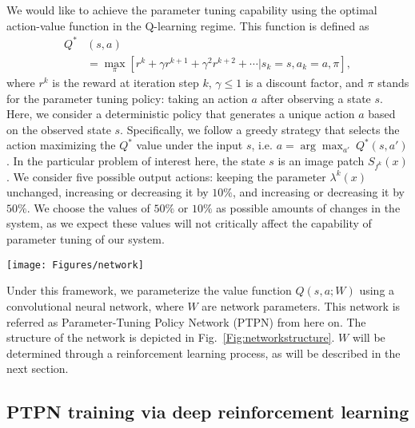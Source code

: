 \documentclass[journal]{IEEEtran}
\begin{document}
We would like to achieve the parameter tuning capability using the optimal action-value function in the Q-learning regime\cite{Watkins:ML:1992}. This function is defined as 
\begin{equation}
\begin{split}
	Q^*&(s, a)\\
	&=\max_{\pi}[r^k+\gamma r^{k+1}+\gamma^2 r^{k+2}+\cdots|s_k =s,a_k=a,\pi ],
\end{split}
\end{equation}
where $r^k$ is the reward at iteration step $k$, $\gamma\le 1$ is a discount factor, and $\pi$ stands for the parameter tuning policy: taking an action $a$ after observing a state $s$. Here, we consider a deterministic policy that generates a unique action $a$ based on the observed state $s$. Specifically, we follow a greedy strategy that selects the action maximizing the $Q^*$ value under the input $s$, i.e. $a= \arg\max_{a'}~Q^*(s,a')$. In the particular problem of interest here, the state $s$ is an image patch $S_{f^k}(x)$. We consider five possible output actions: keeping the parameter $\lambda^k(x)$ unchanged, increasing or decreasing it by $10\%$, and increasing or decreasing it by $50\%$. We choose the values of $50\%$ or $10\%$ as possible amounts of changes in the system, as we expect these values will not critically affect the capability of parameter tuning of our system. 

\begin{figure*}[htbp]
  \texttt{[image: Figures/network]}
  \caption{Network structure of PTPN. The input is a patch cropped out of the solution image $f^k$. The five outputs are directions and magnitudes of changing the parameter at the patch center pixel. Number of units and data sizes at each layer are specified at the top. Connection between subsequent layers are also presented.}
  \label{Fig:networkstructure}
\end{figure*}

Under this framework, we parameterize the value function $Q(s,a;W)$ using a convolutional neural network, where $W$ are network parameters. This network is referred as Parameter-Tuning Policy Network (PTPN) from here on. The structure of the network is depicted in Fig.~\ref{Fig:networkstructure}. $W$ will be determined through a reinforcement learning process, as will be described in the next section. 



\subsection{PTPN training via deep reinforcement learning}
\end{document}

